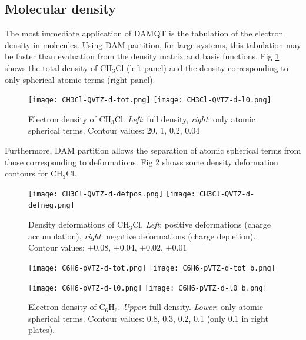 \documentclass[10pt]{article}
\begin{document}
\subsection{Molecular density \label{sec:6.1}}

The most immediate application of DAMQT is the tabulation of the electron
density in molecules. Using DAM partition, for large systems, this tabulation 
may be faster than evaluation from the density matrix and basis functions. Fig 
\ref{fig:6_1_1} shows the total density of CH$_3$Cl (left panel) and the 
density corresponding to only spherical atomic terms (right panel).


\begin{figure}[H]
\vspace*{-2mm}
\begin{center}
\texttt{[image: CH3Cl-QVTZ-d-tot.png]}
\hspace*{5mm}
\texttt{[image: CH3Cl-QVTZ-d-l0.png]}
\end{center}
\caption[Electron density of CH$_3$Cl]{ Electron density of CH$_3$Cl. {\it Left}: full density, {\it right}:
only atomic spherical terms. Contour values: 20, 1, 0.2, 0.04
\label{fig:6_1_1}}
\end{figure}

Furthermore, DAM partition allows the separation of atomic spherical terms
from those corresponding to deformations. Fig \ref{fig:6_1_2} shows some
density deformation contours for CH$_3$Cl.


\begin{figure}[H]
\vspace*{-2mm}
\begin{center}
\texttt{[image: CH3Cl-QVTZ-d-defpos.png]}
\hspace*{5mm}
\texttt{[image: CH3Cl-QVTZ-d-defneg.png]}
\vspace*{0.cm}
\end{center}
\caption[Density deformations of CH$_3$Cl]{ Density deformations of CH$_3$Cl. {\it Left}: positive deformations
(charge accumulation),
{\it right}: negative deformations (charge depletion). Contour values:
$\pm 0.08$, $\pm 0.04$, $\pm 0.02$, $\pm 0.01$
\label{fig:6_1_2}}
\end{figure}


\begin{figure}[H]
\begin{center}
\texttt{[image: C6H6-pVTZ-d-tot.png]}
\hspace*{5mm}
\texttt{[image: C6H6-pVTZ-d-tot\_b.png]}

\vspace*{7mm}
\texttt{[image: C6H6-pVTZ-d-l0.png]}
\hspace*{5mm}
\texttt{[image: C6H6-pVTZ-d-l0\_b.png]}
\end{center}
\caption[Electron density of C$_6$H$_6$]{ Electron density of C$_6$H$_6$. {\it Upper}: full density. {\it
Lower}: only atomic spherical terms. Contour values: 0.8, 0.3, 0.2, 0.1 (only
0.1 in right plates).
\label{fig:6_1_3}}
\end{figure}
\end{document}
